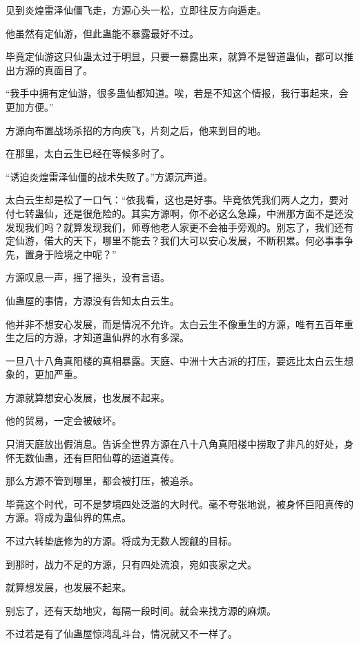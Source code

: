
\begin{this_body}

见到炎煌雷泽仙僵飞走，方源心头一松，立即往反方向遁走。

他虽然有定仙游，但此蛊能不暴露最好不过。

毕竟定仙游这只仙蛊太过于明显，只要一暴露出来，就算不是智道蛊仙，都可以推出方源的真面目了。

“我手中拥有定仙游，很多蛊仙都知道。唉，若是不知这个情报，我行事起来，会更加方便。”

方源向布置战场杀招的方向疾飞，片刻之后，他来到目的地。

在那里，太白云生已经在等候多时了。

“诱迫炎煌雷泽仙僵的战术失败了。”方源沉声道。

太白云生却是松了一口气：“依我看，这也是好事。毕竟依凭我们两人之力，要对付七转蛊仙，还是很危险的。其实方源啊，你不必这么急躁，中洲那方面不是还没发现我们吗？就算发现我们，师尊他老人家更不会袖手旁观的。别忘了，我们还有定仙游，偌大的天下，哪里不能去？我们大可以安心发展，不断积累。何必事事争先，置身于险境之中呢？”

方源叹息一声，摇了摇头，没有言语。

仙蛊屋的事情，方源没有告知太白云生。

他并非不想安心发展，而是情况不允许。太白云生不像重生的方源，唯有五百年重生之后的方源，才知道蛊仙界的水有多深。

一旦八十八角真阳楼的真相暴露。天庭、中洲十大古派的打压，要远比太白云生想象的，更加严重。

方源就算想安心发展，也发展不起来。

他的贸易，一定会被破坏。

只消天庭放出假消息。告诉全世界方源在八十八角真阳楼中捞取了非凡的好处，身怀无数仙蛊，还有巨阳仙尊的运道真传。

那么方源不管到哪里，都会被打压，被追杀。

毕竟这个时代，可不是梦境四处泛滥的大时代。毫不夸张地说，被身怀巨阳真传的方源。将成为蛊仙界的焦点。

不过六转垫底修为的方源。将成为无数人觊觎的目标。

到那时，战力不足的方源，只有四处流浪，宛如丧家之犬。

就算想发展，也发展不起来。

别忘了，还有天劫地灾，每隔一段时间。就会来找方源的麻烦。

不过若是有了仙蛊屋惊鸿乱斗台，情况就又不一样了。


\end{this_body}
